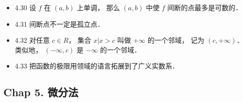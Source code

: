 \begin{itemize}
\item 4.30 设 $f$ 在 $(a,b)$ 上单调， 那么 $(a,b)$ 中使 $f$ 间断的点最多是可数的．

\item 4.31 间断点不一定是孤立点． 

\item 4.32 对任意 $c\in R$， 集合 ${x|x>c}$ 叫做 $+\infty$ 的一个邻域， 记为 $(c,+\infty)$． 类似地， $(-\infty, c)$ 是 $-\infty$ 的一个邻域．

\item 4.33 把函数的极限用领域的语言拓展到了广义实数系．
\end{itemize}

\subsection{Chap 5. 微分法}
